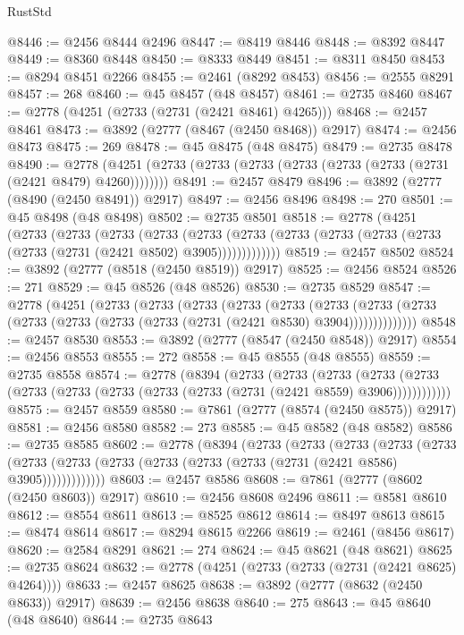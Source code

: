 \begin{lexlean}{RustStd}
\begin{coremodule}
@8446 := @2456 @8444 @2496
@8447 := @8419 @8446
@8448 := @8392 @8447
@8449 := @8360 @8448
@8450 := @8333 @8449
@8451 := @8311 @8450
@8453 := @8294 @8451 @2266
@8455 := @2461 (@8292 @8453)
@8456 := @2555 @8291
@8457 := 268
@8460 := @45 @8457 (@48 @8457)
@8461 := @2735 @8460
@8467 := @2778 (@4251 (@2733 (@2731 (@2421 @8461) @4265)))
@8468 := @2457 @8461
@8473 := @3892 (@2777 (@8467 (@2450 @8468)) @2917)
@8474 := @2456 @8473
@8475 := 269
@8478 := @45 @8475 (@48 @8475)
@8479 := @2735 @8478
@8490 := @2778 (@4251 (@2733 (@2733 (@2733 (@2733 (@2733 (@2733 (@2731 (@2421 @8479) @4260))))))))
@8491 := @2457 @8479
@8496 := @3892 (@2777 (@8490 (@2450 @8491)) @2917)
@8497 := @2456 @8496
@8498 := 270
@8501 := @45 @8498 (@48 @8498)
@8502 := @2735 @8501
@8518 := @2778
    (@4251
      (@2733
        (@2733
          (@2733
            (@2733
              (@2733
                (@2733 (@2733 (@2733 (@2733 (@2733 (@2733 (@2731 (@2421 @8502) @3905)))))))))))))
@8519 := @2457 @8502
@8524 := @3892 (@2777 (@8518 (@2450 @8519)) @2917)
@8525 := @2456 @8524
@8526 := 271
@8529 := @45 @8526 (@48 @8526)
@8530 := @2735 @8529
@8547 := @2778
    (@4251
      (@2733
        (@2733
          (@2733
            (@2733
              (@2733
                (@2733
                  (@2733 (@2733 (@2733 (@2733 (@2733 (@2733 (@2731 (@2421 @8530) @3904))))))))))))))
@8548 := @2457 @8530
@8553 := @3892 (@2777 (@8547 (@2450 @8548)) @2917)
@8554 := @2456 @8553
@8555 := 272
@8558 := @45 @8555 (@48 @8555)
@8559 := @2735 @8558
@8574 := @2778
    (@8394
      (@2733
        (@2733
          (@2733
            (@2733 (@2733 (@2733 (@2733 (@2733 (@2733 (@2733 (@2731 (@2421 @8559) @3906))))))))))))
@8575 := @2457 @8559
@8580 := @7861 (@2777 (@8574 (@2450 @8575)) @2917)
@8581 := @2456 @8580
@8582 := 273
@8585 := @45 @8582 (@48 @8582)
@8586 := @2735 @8585
@8602 := @2778
    (@8394
      (@2733
        (@2733
          (@2733
            (@2733
              (@2733
                (@2733 (@2733 (@2733 (@2733 (@2733 (@2733 (@2731 (@2421 @8586) @3905)))))))))))))
@8603 := @2457 @8586
@8608 := @7861 (@2777 (@8602 (@2450 @8603)) @2917)
@8610 := @2456 @8608 @2496
@8611 := @8581 @8610
@8612 := @8554 @8611
@8613 := @8525 @8612
@8614 := @8497 @8613
@8615 := @8474 @8614
@8617 := @8294 @8615 @2266
@8619 := @2461 (@8456 @8617)
@8620 := @2584 @8291
@8621 := 274
@8624 := @45 @8621 (@48 @8621)
@8625 := @2735 @8624
@8632 := @2778 (@4251 (@2733 (@2733 (@2731 (@2421 @8625) @4264))))
@8633 := @2457 @8625
@8638 := @3892 (@2777 (@8632 (@2450 @8633)) @2917)
@8639 := @2456 @8638
@8640 := 275
@8643 := @45 @8640 (@48 @8640)
@8644 := @2735 @8643

\end{coremodule}
\end{lexlean}
